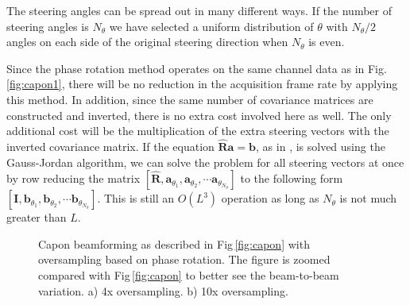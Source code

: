 \documentclass[journal]{IEEEtran}
\newcommand{\mat}[1]{\mathbf{#1}}
\renewcommand{\vec}[1]{\mathbf{#1}}
\newcommand{\img}{img/}
\begin{document}
The steering angles can be spread out in many different ways. If the number of steering angles is $N_\theta$ we have selected a uniform distribution of $\theta$  with $N_\theta/2$ angles on each side of the original steering direction when $N_\theta$ is even.%

Since the phase rotation method operates on the same channel data as in Fig.\,\ref{fig:capon1}, there will be no reduction in the acquisition frame rate by applying this method. In addition, since the same number of covariance matrices are constructed and inverted, there is no extra cost involved here as well. The only additional cost will be the multiplication of the extra steering vectors with the inverted covariance matrix. If the equation $\mat{\hat{R}}\vec{a} = \vec{b}$, as in \cite{Asen}, is solved using the Gauss-Jordan algorithm, we can solve the problem for all steering vectors at once by row reducing the matrix $[\mat{\hat{R}},  \vec{a}_{\theta_1}, \vec{a}_{\theta_2}, \cdots \vec{a}_{\theta_{N_\theta}}]$ to the following form $[\mat{I},  \vec{b}_{\theta_1}, \vec{b}_{\theta_2}, \cdots \vec{b}_{\theta_{N_\theta}}]$. This is still an $O(L^3)$ operation as long as $N_\theta$ is not much greater than $L$.

\begin{figure}[!t]
	\centerline{
	}
	\caption{Capon beamforming as described in Fig\,\ref{fig:capon} with oversampling based on phase rotation. The figure is zoomed compared with Fig\,\ref{fig:capon} to better see the beam-to-beam variation. a) 4x oversampling. b) 10x oversampling.}
	\label{fig:benchmark_capon_bs}
\end{figure}
\end{document}
